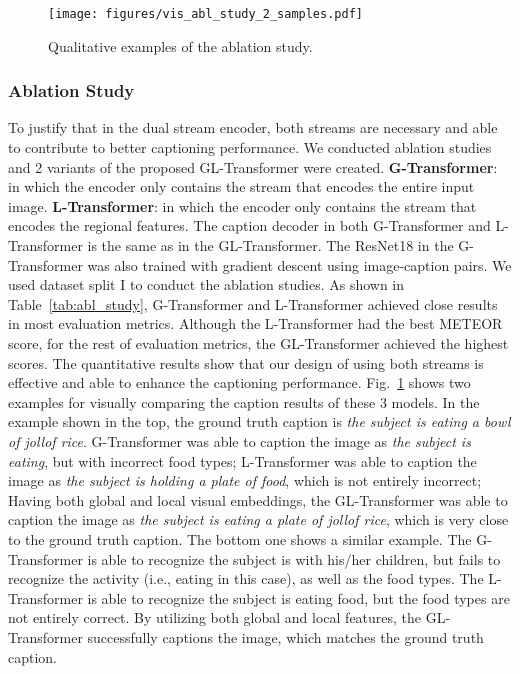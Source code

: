 \documentclass[journal]{IEEEtran}
\begin{document}
\begin{figure}[!t]
\centerline{\texttt{[image: figures/vis\_abl\_study\_2\_samples.pdf]}}
\caption{Qualitative examples of the ablation study.}
\label{fig:vis_abl_study}

\end{figure}








\subsubsection{Ablation Study}

To justify that in the dual stream encoder, both streams are necessary and able to contribute to better captioning performance. We conducted ablation studies and 2 variants of the proposed GL-Transformer were created. \textbf{G-Transformer}: in which the encoder only contains the stream that encodes the entire input image. \textbf{L-Transformer}: in which the encoder only contains the stream that encodes the regional features. The caption decoder in both G-Transformer and L-Transformer is the same as in the GL-Transformer. The ResNet18 in the G-Transformer was also trained with gradient descent using image-caption pairs. We used dataset split I to conduct the ablation studies. As shown in Table~\ref{tab:abl_study}, G-Transformer and L-Transformer achieved close results in most evaluation metrics. Although the L-Transformer had the best METEOR score, for the rest of evaluation metrics, the GL-Transformer achieved the highest scores. The quantitative results show that our design of using both streams is effective and able to enhance the captioning performance. Fig.~\ref{fig:vis_abl_study} shows two examples for visually comparing the caption results of these 3 models. In the example shown in the top, the ground truth caption is \textit{the subject is eating a bowl of jollof rice}. G-Transformer was able to caption the image as \textit{the subject is eating}, but with incorrect food types; L-Transformer was able to caption the image as \textit{the subject is holding a plate of food}, which is not entirely incorrect; Having both global and local visual embeddings, the GL-Transformer was able to caption the image as \textit{the subject is eating a plate of jollof rice}, which is very close to the ground truth caption. The bottom one shows a similar example. The G-Transformer is able to recognize the subject is with his/her children, but fails to recognize the activity (i.e., eating in this case), as well as the food types. The L-Transformer is able to recognize the subject is eating food, but the food types are not entirely correct. By utilizing both global and local features, the GL-Transformer successfully captions the image, which matches the ground truth caption.
\end{document}

